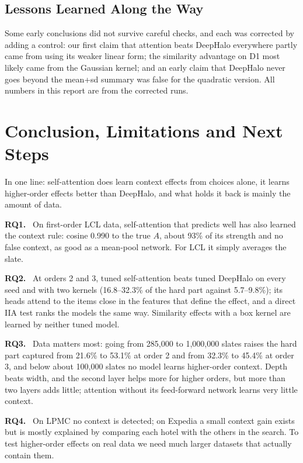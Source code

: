 \documentclass[11pt,a4paper]{article}
\numberwithin{table}{section}
\numberwithin{figure}{section}
\numberwithin{equation}{section}
\newcommand{\para}[1]{\textbf{#1}\ }
\begin{document}
\subsection{Lessons Learned Along the Way}
Some early conclusions did not survive careful checks, and each was corrected by adding a control: our first claim that attention beats DeepHalo everywhere partly came from using its weaker linear form; the similarity advantage on D1 most likely came from the Gaussian kernel; and an early claim that DeepHalo never goes beyond the mean+sd summary was false for the quadratic version. All numbers in this report are from the corrected runs.

\section{Conclusion, Limitations and Next Steps}
In one line: self-attention does learn context effects from choices alone, it learns higher-order effects better than DeepHalo, and what holds it back is mainly the amount of data.

\para{RQ1.} On first-order LCL data, self-attention that predicts well has also learned the context rule: cosine 0.990 to the true $A$, about 93\% of its strength and no false context, as good as a mean-pool network. For LCL it simply averages the slate.

\para{RQ2.} At orders 2 and 3, tuned self-attention beats tuned DeepHalo on every seed and with two kernels (16.8--32.3\% of the hard part against 5.7--9.8\%); its heads attend to the items close in the features that define the effect, and a direct IIA test ranks the models the same way. Similarity effects with a box kernel are learned by neither tuned model.

\para{RQ3.} Data matters most: going from 285,000 to 1,000,000 slates raises the hard part captured from 21.6\% to 53.1\% at order 2 and from 32.3\% to 45.4\% at order 3, and below about 100,000 slates no model learns higher-order context. Depth beats width, and the second layer helps more for higher orders, but more than two layers adds little; attention without its feed-forward network learns very little context.

\para{RQ4.} On LPMC no context is detected; on Expedia a small context gain exists but is mostly explained by comparing each hotel with the others in the search. To test higher-order effects on real data we need much larger datasets that actually contain them.
\end{document}
